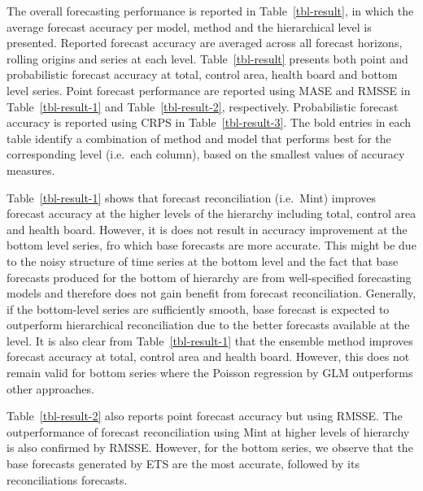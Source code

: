 \documentclass[
  authoryear,
  preprint,
  3p]{elsarticle}
\begin{document}
The overall forecasting performance is reported in
Table~\ref{tbl-result}, in which the average forecast accuracy per
model, method and the hierarchical level is presented. Reported forecast
accuracy are averaged across all forecast horizons, rolling origins and
series at each level. Table~\ref{tbl-result} presents both point and
probabilistic forecast accuracy at total, control area, health board and
bottom level series. Point forecast performance are reported using MASE
and RMSSE in Table~\ref{tbl-result-1} and Table~\ref{tbl-result-2},
respectively. Probabilistic forecast accuracy is reported using CRPS in
Table~\ref{tbl-result-3}. The bold entries in each table identify a
combination of method and model that performs best for the corresponding
level (i.e.~each column), based on the smallest values of accuracy
measures.

Table~\ref{tbl-result-1} shows that forecast reconciliation (i.e.~Mint)
improves forecast accuracy at the higher levels of the hierarchy
including total, control area and health board. However, it is does not
result in accuracy improvement at the bottom level series, fro which
base forecasts are more accurate. This might be due to the noisy
structure of time series at the bottom level and the fact that base
forecasts produced for the bottom of hierarchy are from well-specified
forecasting models and therefore does not gain benefit from forecast
reconciliation. Generally, if the bottom-level series are sufficiently
smooth, base forecast is expected to outperform hierarchical
reconciliation due to the better forecasts available at the level. It is
also clear from Table~\ref{tbl-result-1} that the ensemble method
improves forecast accuracy at total, control area and health board.
However, this does not remain valid for bottom series where the Poisson
regression by GLM outperforms other approaches.

Table~\ref{tbl-result-2} also reports point forecast accuracy but using
RMSSE. The outperformance of forecast reconciliation using Mint at
higher levels of hierarchy is also confirmed by RMSSE. However, for the
bottom series, we observe that the base forecasts generated by ETS are
the most accurate, followed by its reconciliations forecasts.
\end{document}
